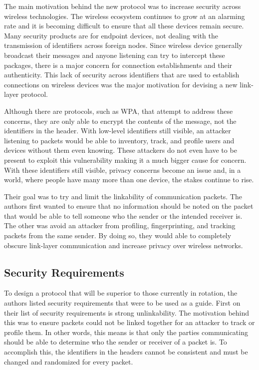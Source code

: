 \smallskip

The main motivation behind the new protocol was to increase security across wireless technologies. The wireless ecosystem continues to grow at an alarming rate and it is becoming difficult to ensure that all these devices remain secure. Many security products are for endpoint devices, not dealing with the transmission of identifiers across foreign nodes. Since wireless device generally broadcast their messages and anyone listening can try to intercept these packages, there is a major concern for connection establishments and their authenticity. This lack of security across identifiers that are used to establish connections on wireless devices was the major motivation for devising a new link-layer protocol. 

\smallskip

Although there are protocols, such as WPA, that attempt to address these concerns, they are only able to encrypt the contents of the message, not the identifiers in the header. With low-level identifiers still visible, an attacker listening to packets would be able to inventory, track, and profile users and devices without them even knowing. These attackers do not even have to be present to exploit this vulnerability making it a much bigger cause for concern. With these identifiers still visible, privacy concerns become an issue and, in a world, where people have many more than one device, the stakes continue to rise.

\smallskip

Their goal was to try and limit the linkability of communication packets. The authors first wanted to ensure that no information should be noted on the packet that would be able to tell someone who the sender or the intended receiver is. The other was avoid an attacker from profiling, fingerprinting, and tracking packets from the same sender. By doing so, they would able to completely obscure link-layer communication and increase privacy over wireless networks.

\subsection {Security Requirements}

To design a protocol that will be superior to those currently in rotation, the authors listed security requirements that were to be used as a guide. 
First on their list of security requirements is strong unlinkability. The motivation behind this was to ensure packets could not be linked together for an attacker to track or profile them. In other words, this means is that only the parties communicating should be able to determine who the sender or receiver of a packet is. To accomplish this, the identifiers in the headers cannot be consistent and must be changed and randomized for every packet.

